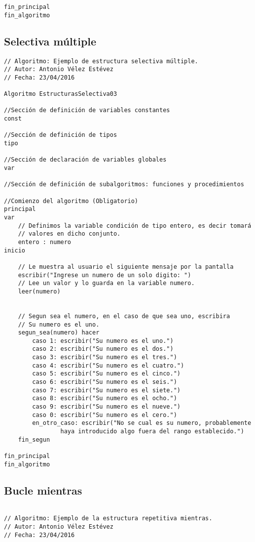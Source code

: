 \documentclass{article}
\begin{document}
\begin{appendices}
\begin{lstlisting}[language = pseudocodigoesp]
fin_principal
fin_algoritmo
\end{lstlisting}
\subsection{Selectiva múltiple}
\begin{lstlisting}[language = pseudocodigoesp]
// Algoritmo: Ejemplo de estructura selectiva múltiple.
// Autor: Antonio Vélez Estévez
// Fecha: 23/04/2016
 
Algoritmo EstructurasSelectiva03

//Sección de definición de variables constantes
const 
	
//Sección de definición de tipos
tipo

//Sección de declaración de variables globales	
var

//Sección de definición de subalgoritmos: funciones y procedimientos	

//Comienzo del algoritmo (Obligatorio)
principal	
var
	// Definimos la variable condición de tipo entero, es decir tomará
	// valores en dicho conjunto.
	entero : numero
inicio 	

	// Le muestra al usuario el siguiente mensaje por la pantalla
	escribir("Ingrese un numero de un solo digito: ")
	// Lee un valor y lo guarda en la variable numero.
	leer(numero)
	
	
	// Segun sea el numero, en el caso de que sea uno, escribira
	// Su numero es el uno.
	segun_sea(numero) hacer
		caso 1: escribir("Su numero es el uno.")
		caso 2: escribir("Su numero es el dos.")
		caso 3: escribir("Su numero es el tres.")
		caso 4: escribir("Su numero es el cuatro.")
		caso 5: escribir("Su numero es el cinco.")
		caso 6: escribir("Su numero es el seis.")
		caso 7: escribir("Su numero es el siete.")
		caso 8: escribir("Su numero es el ocho.")
		caso 9: escribir("Su numero es el nueve.")
		caso 0: escribir("Su numero es el cero.")
		en_otro_caso: escribir("No se cual es su numero, probablemente
                haya introducido algo fuera del rango establecido.")
	fin_segun

fin_principal
fin_algoritmo
\end{lstlisting}
\subsection{Bucle mientras}
\begin{lstlisting}[language = pseudocodigoesp]

// Algoritmo: Ejemplo de la estructura repetitiva mientras.
// Autor: Antonio Vélez Estévez
// Fecha: 23/04/2016


\end{lstlisting}
\end{appendices}
\end{document}
